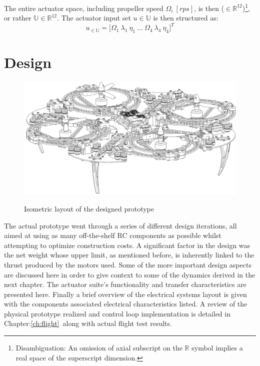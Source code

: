 The entire actuator space, including propeller speed $\Omega_i~[rps]$, is then ($\in\mathbb{R}^{12}$)\footnote{Disambiguation: An omission of axial subscript on the $\mathbb{R}$ symbol implies a real space of the superscript dimension.}, or rather $\mathbb{U}\in\mathbb{R}^{12}$. The actuator input set $u \in \mathbb{U}$ is then structured as:
\begin{equation}
u_{\in\mathbb{U}}=\big[ \Omega_{1} ~ \lambda_{1} ~ \eta_{1} ~ \ldots ~ \Omega_{4} ~ \lambda_{4} ~ \eta_{4}  \big]^T
\end{equation}
\section{Design}
\label{sec:proto.design}
\begin{figure}[htbp]
\centering
\includegraphics[width=\textwidth]{figs/iso-design}
\label{fig:iso-design}
\caption{Isometric layout of the designed prototype}
\end{figure}
The actual prototype went through a series of different design iterations, all aimed at using as many off-the-shelf RC components as possible whilst attempting to optimize construction costs. A significant factor in the design was the net weight whose upper limit, as mentioned before, is inherently linked to the thrust produced by the motors used. Some of the more important design aspects are discussed here in order to give context to some of the dynamics derived in the next chapter. The actuator suite's functionality and transfer characteristics are presented here. Finally a brief overview of the electrical systems layout is given with the components associated electrical characteristics listed. A review of the physical prototype realized and control loop implementation is detailed in Chapter:\ref{ch:flight}~along with actual flight test results.
